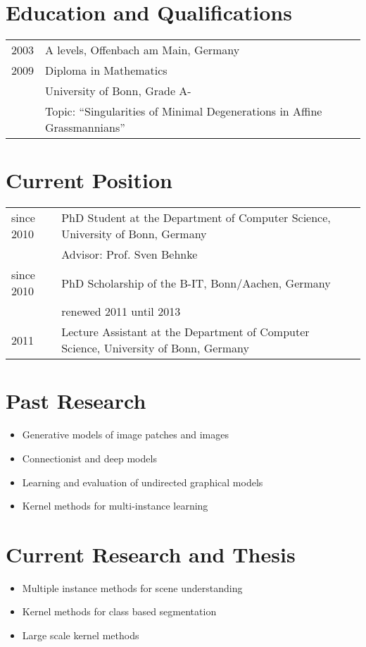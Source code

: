 \documentclass[a4paper,11pt]{article}
\begin{document}
\maketitle

\section{Education and Qualifications}
\begin{tabular}{lll}
    2003 & A levels, Offenbach am Main, Germany\\
    2009 & Diploma in Mathematics \\ & University of Bonn, Grade A-\\
         & Topic: ``Singularities of Minimal Degenerations in Affine Grassmannians''
\end{tabular}

\section{Current Position}
\begin{tabular}{lll}
    since 2010 & PhD Student at the Department of Computer Science, University of Bonn, Germany\\
               & Advisor: Prof. Sven Behnke\\
    since 2010 & PhD Scholarship of the B-IT, Bonn/Aachen, Germany\\
               & renewed 2011 until 2013\\
    2011 & Lecture Assistant at the Department of Computer Science, University of Bonn, Germany
\end{tabular}

\section{Past Research}
\begin{itemize}
    \item Generative models of image patches and images
    \item Connectionist and deep models
    \item Learning and evaluation of undirected graphical models
    \item Kernel methods for multi-instance learning
\end{itemize}

\section{Current Research and Thesis}
\begin{itemize}
    \item Multiple instance methods for scene understanding
    \item Kernel methods for class based segmentation
    \item Large scale kernel methods
\end{itemize}
\end{document}
